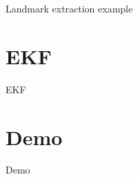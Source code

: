 \documentclass[xcolor=dvipsnames]{beamer}
\begin{document}
  {
  \begin{frame}{Landmark extraction example}
  \end{frame}
  }

  \section{EKF}
  \begin{frame}{EKF}
    
  \end{frame}
  
  \section{Demo}
  \begin{frame}{Demo}
    
  \end{frame}
  
\end{document}
